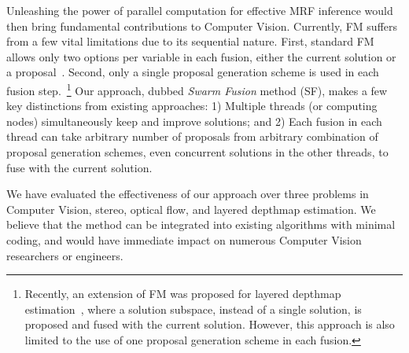 Unleashing the power of parallel computation for effective MRF inference
would then bring fundamental contributions to Computer
Vision. Currently, FM suffers from a few vital limitations due to its
sequential nature. First, standard FM allows only two options per
variable in each fusion, either the current solution or a
proposal~\cite{fusion_moves_for_markov_random_field_optimization}. Second,
only a single proposal generation scheme is used in each fusion
step.~\footnote{Recently, an extension of FM was proposed for layered
depthmap estimation~\cite{layered_depthmap}, where a solution subspace, instead
of a single solution, is proposed and fused with the current
solution. However, this approach is also limited to the use of one proposal
generation scheme in each fusion.}
%
Our approach, dubbed {\it Swarm Fusion} method (SF), makes a
few key distinctions from existing approaches: 1) Multiple threads (or
computing nodes) simultaneously keep and improve solutions; and 2) Each
fusion in each thread can take arbitrary number of proposals from
arbitrary combination of proposal generation schemes, even concurrent
solutions in the other threads, to fuse with the current solution.
%


We have evaluated the effectiveness of our approach over three problems
in Computer Vision, stereo, optical flow, and layered
depthmap estimation.
%
%
%
We believe that the method can be integrated into existing algorithms
with minimal coding, and would have immediate impact on numerous
Computer Vision researchers or engineers.



%
%


